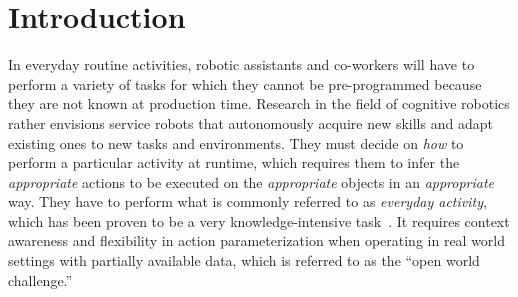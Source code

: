 \documentclass[oribibl]{llncs}
\begin{document}
\section*{Introduction} 

In everyday routine activities, robotic assistants and co-workers 
will have to perform a variety of tasks for which they cannot be 
pre-programmed because they are not known at production time. 
Research in the field of cognitive robotics rather envisions service 
robots that autonomously acquire new skills and adapt existing ones 
to new tasks and environments. They must decide on \textit{how} to 
perform a particular activity at runtime, which requires them to infer 
the \textit{appropriate} actions to be executed on the \textit 
{appropriate} objects in an \textit{appropriate} way. They have to 
perform what is commonly referred to as \textit{everyday activity}, 
which has been proven to be a very knowledge-intensive task~\cite 
{anderson95phd, nyga12actioncore}. It requires context awareness and 
flexibility in action parameterization when operating in real world 
settings with partially available data, which is referred to as the 
``open world challenge.'' 
\end{document}
